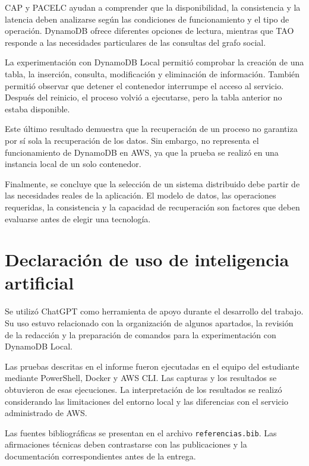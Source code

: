 \documentclass[12pt,a4paper]{article}
\begin{document}
CAP y PACELC ayudan a comprender que la disponibilidad, la consistencia y la latencia deben analizarse según las condiciones de funcionamiento y el tipo de operación. DynamoDB ofrece diferentes opciones de lectura, mientras que TAO responde a las necesidades particulares de las consultas del grafo social.

La experimentación con DynamoDB Local permitió comprobar la creación de una tabla, la inserción, consulta, modificación y eliminación de información. También permitió observar que detener el contenedor interrumpe el acceso al servicio. Después del reinicio, el proceso volvió a ejecutarse, pero la tabla anterior no estaba disponible.

Este último resultado demuestra que la recuperación de un proceso no garantiza por sí sola la recuperación de los datos. Sin embargo, no representa el funcionamiento de DynamoDB en AWS, ya que la prueba se realizó en una instancia local de un solo contenedor.

Finalmente, se concluye que la selección de un sistema distribuido debe partir de las necesidades reales de la aplicación. El modelo de datos, las operaciones requeridas, la consistencia y la capacidad de recuperación son factores que deben evaluarse antes de elegir una tecnología.

\section{Declaración de uso de inteligencia artificial}

Se utilizó ChatGPT como herramienta de apoyo durante el desarrollo del trabajo. Su uso estuvo relacionado con la organización de algunos apartados, la revisión de la redacción y la preparación de comandos para la experimentación con DynamoDB Local.

Las pruebas descritas en el informe fueron ejecutadas en el equipo del estudiante mediante PowerShell, Docker y AWS CLI. Las capturas y los resultados se obtuvieron de esas ejecuciones. La interpretación de los resultados se realizó considerando las limitaciones del entorno local y las diferencias con el servicio administrado de AWS.

Las fuentes bibliográficas se presentan en el archivo \texttt{referencias.bib}. Las afirmaciones técnicas deben contrastarse con las publicaciones y la documentación correspondientes antes de la entrega.
\end{document}
